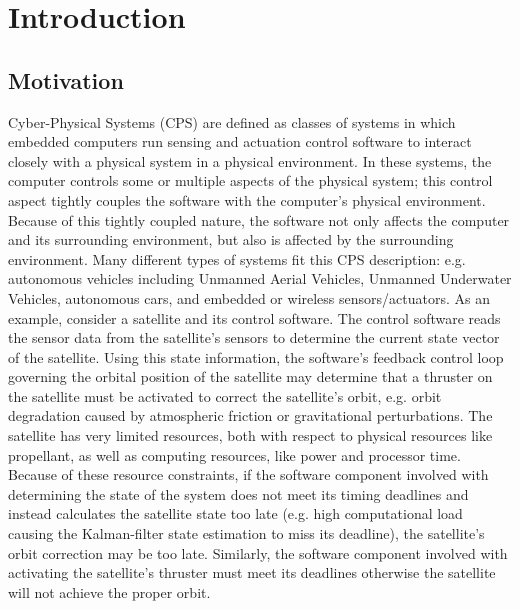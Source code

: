 \chapter{Introduction}
\label{ch:intro}

\section{Motivation}
\label{sec:motivation}

Cyber-Physical Systems (CPS) are defined as classes of systems in
which embedded computers run sensing and actuation control software to
interact closely with a physical system in a physical environment.  In
these systems, the computer controls some or multiple aspects of the
physical system; this control aspect tightly couples the software with
the computer's physical environment.  Because of this tightly coupled
nature, the software not only affects the computer and its surrounding
environment, but also is affected by the surrounding environment.
Many different types of systems fit this CPS description:
e.g. autonomous vehicles including Unmanned Aerial Vehicles, Unmanned
Underwater Vehicles, autonomous cars, and embedded or wireless
sensors/actuators.  As an example, consider a satellite and its
control software.  The control software reads the sensor data from the
satellite's sensors to determine the current state vector of the
satellite.  Using this state information, the software's feedback
control loop governing the orbital position of the satellite may
determine that a thruster on the satellite must be activated to
correct the satellite's orbit, e.g. orbit degradation caused by
atmospheric friction or gravitational perturbations.  The satellite
has very limited resources, both with respect to physical resources
like propellant, as well as computing resources, like power and
processor time.  Because of these resource constraints, if the
software component involved with determining the state of the system
does not meet its timing deadlines and instead calculates the
satellite state too late (e.g. high computational load causing the
Kalman-filter state estimation to miss its deadline), the satellite's
orbit correction may be too late.  Similarly, the software component
involved with activating the satellite's thruster must meet its
deadlines otherwise the satellite will not achieve the proper orbit.

